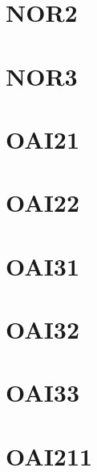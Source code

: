 \documentclass[10pt,a4paper,twoside]{report}
\begin{document}
\section{NOR2}

\clearpage

\section{NOR3}

\clearpage



\section{OAI21}

\clearpage

\section{OAI22}

\clearpage

\section{OAI31}

\clearpage

\section{OAI32}

\clearpage

\section{OAI33}

\clearpage

\section{OAI211}

\clearpage
\end{document}
